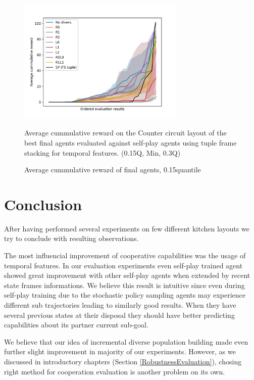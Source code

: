 \begin{figure}[!ht]
    \centering
    \includegraphics*[width=8cm]{../img/CounterCircuitFSTupleOrderedQ15.png}

    \caption{Average cummulative reward of final agents, 0.15quantile}
    \label{CounterCircuitFSTupleOrderedQ15}
    \medskip
    \small 
    Average cummulative reward on the Counter circuit layout of the best final agents evaluated against self-play agents using tuple frame stacking for temporal features.
    (0.15Q, Min, 0.3Q)

\end{figure}



\section{Conclusion}

After having performed several experiments on few different kitchen layouts we try to conclude with resulting observations.

The most influencial improvement of cooperative capabilities was the usage of temporal features.
In our evaluation experiments even self-play trained agent showed great improvement with other self-play agents when extended by recent state frames informations.
We believe this result is intuitive since even during self-play training due to the stochastic policy sampling agents may experience different sub trajectories leading to similarly good results.
When they have several previous states at their disposal they should have better predicting capabilities about its partner current sub-goal.

We believe that our idea of incremental diverse population building made even further slight improvement in majority of our experiments.
However, as we discussed in introductory chapters (Section \ref{RobustnessEvaluation}), chosing right method for cooperation evaluation is another problem on its own.

